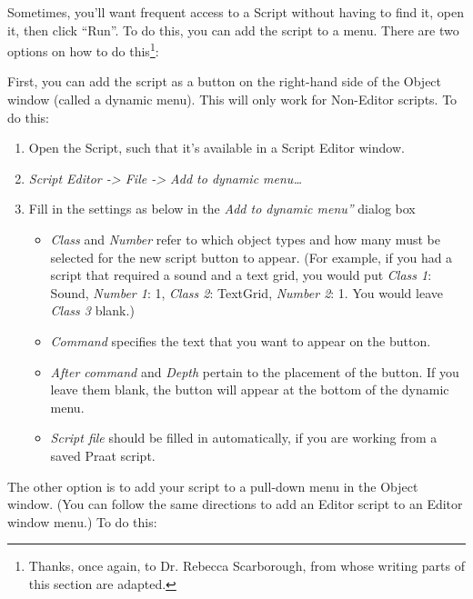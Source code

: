 \documentclass[11pt]{article}
\def\tightlist{}
\begin{document}
\label{menushortcuts}

Sometimes, you'll want frequent access to a Script without having to
find it, open it, then click ``Run''. To do this, you can add the script
to a menu. There are two options on how to do
this\footnote{Thanks, once again, to Dr. Rebecca Scarborough, from whose writing parts of this section are adapted.}:

First, you can add the script as a button on the right-hand side of the
Object window (called a dynamic menu). This will only work for
Non-Editor scripts. To do this:

\begin{enumerate}
\def\labelenumi{\arabic{enumi}.}
\tightlist
\item
  Open the Script, such that it's available in a Script Editor window.
\item
  \emph{Script Editor -\textgreater{} File -\textgreater{} Add to
  dynamic menu\ldots{}}
\item
  Fill in the settings as below in the \emph{Add to dynamic menu''}
  dialog box

  \begin{itemize}
  \tightlist
  \item
    \emph{Class} and \emph{Number} refer to which object types and how
    many must be selected for the new script button to appear. (For
    example, if you had a script that required a sound and a text grid,
    you would put \emph{Class 1}: Sound, \emph{Number 1}: 1, \emph{Class
    2}: TextGrid, \emph{Number 2}: 1. You would leave \emph{Class 3}
    blank.)
  \item
    \emph{Command} specifies the text that you want to appear on the
    button.
  \item
    \emph{After command} and \emph{Depth} pertain to the placement of
    the button. If you leave them blank, the button will appear at the
    bottom of the dynamic menu.
  \item
    \emph{Script file} should be filled in automatically, if you are
    working from a saved Praat script.
  \end{itemize}
\end{enumerate}

The other option is to add your script to a pull-down menu in the Object
window. (You can follow the same directions to add an Editor script to
an Editor window menu.) To do this:
\end{document}
